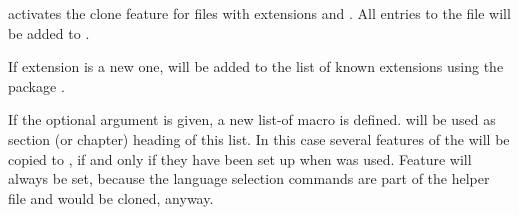 \begin{Declaration}
\end{Declaration}
activates the clone feature for files with extensions  and
. All entries to the file
 will be added to
.

If extension  is a new one,  will be
added to the list of known extensions using the \KOMAScript{} package
.

If the optional argument  is given, a new list-of macro
 is defined.  will be used
as section (or chapter) heading of this list. In this case several
 features of the  will be copied to
, if and only if they have been set up when
 was used. Feature  will always be set,
because the language selection commands are part of the helper file and
would be cloned, anyway.

